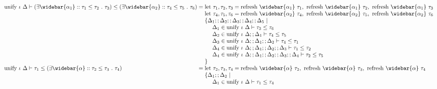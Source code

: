 \documentclass[sigplan,screen]{acmart}
\begin{document}
\begin{figure*}[h]
  \[
    \begin{array}{l @{} l}
      \text{unify } \iota\ \Delta \vdash
      (\exists \widebar{\alpha_1} :: \tau_1 \leq \tau_2\ .\ \tau_3)
      \leq 
      (\exists \widebar{\alpha_2} :: \tau_4 \leq \tau_5\ .\ \tau_6)
      &{} = 
      \begin{array}[t]{@{} l}
        \text{let } \tau_1, \tau_2, \tau_3 = 
        \text{refresh } \widebar{\alpha_1}\ \tau_1,\ 
        \text{refresh } \widebar{\alpha_1}\ \tau_2,\ 
        \text{refresh } \widebar{\alpha_1}\ \tau_3
        \\
        \text{let } \tau_4, \tau_5, \tau_6 = 
        \text{refresh } \widebar{\alpha_2}\ \tau_4,\ 
        \text{refresh } \widebar{\alpha_2}\ \tau_5,\ 
        \text{refresh } \widebar{\alpha_2}\ \tau_6
        \\
        \{\Delta_1;;\Delta_2;;\Delta_3;;\Delta_4;;\Delta_5\ |
        \\ 
        \ \ \ \ \Delta_1 \in \text{unify } \iota\ \Delta \vdash \tau_3 \leq \tau_6
        \\
        \ \ \ \ \Delta_2 \in \text{unify } \iota\ \Delta;;\Delta_1 \vdash \tau_4 \leq \tau_5
        \\
        \ \ \ \ \Delta_3 \in \text{unify } \iota\ \Delta;;\Delta_1;;\Delta_2 \vdash \tau_4 \leq \tau_1
        \\
        \ \ \ \ \Delta_4 \in \text{unify } \iota\ \Delta;;\Delta_1;;\Delta_2;;\Delta_3 \vdash \tau_1 \leq \tau_2
        \\
        \ \ \ \ \Delta_4 \in \text{unify } \iota\ \Delta;;\Delta_1;;\Delta_2;;\Delta_3;;\Delta_4 \vdash \tau_2 \leq \tau_5
        \\
        \}
      \end{array}
      \\
      \text{unify } \iota\ \Delta \vdash
      \tau_1
      \leq 
      (\exists \widebar{\alpha} :: \tau_2 \leq \tau_3\ .\ \tau_4)
      &{} = 
      \begin{array}[t]{@{} l}
        \text{let } \tau_2, \tau_3, \tau_4 = 
        \text{refresh } \widebar{\alpha}\ \tau_2,\ 
        \text{refresh } \widebar{\alpha}\ \tau_3,\ 
        \text{refresh } \widebar{\alpha}\ \tau_4
        \\
        \{\Delta_1;;\Delta_2\ |
        \\ 
        \ \ \ \ \Delta_1 \in \text{unify } \iota\ \Delta \vdash \tau_1 \leq \tau_4
        \\

\end{array}
\end{array}\]
\end{figure*}
\end{document}
